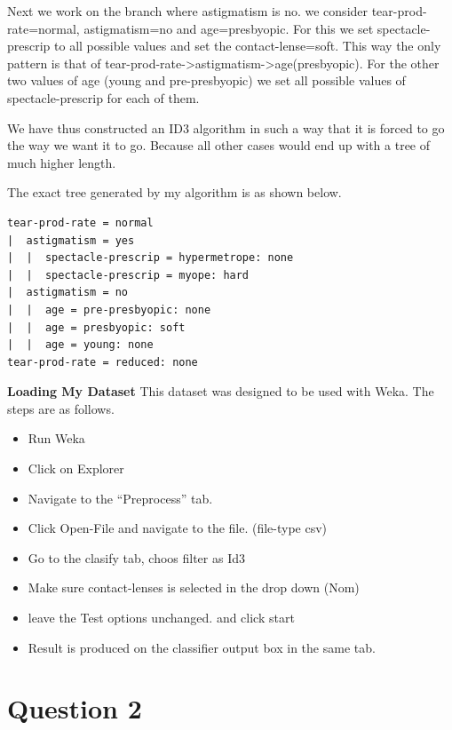 \documentclass[fontsize=10pt]{scrartcl}
\begin{document}
	Next we work on the branch where astigmatism is no. we consider tear-prod-rate=normal, astigmatism=no and age=presbyopic. For this we set spectacle-prescrip to all possible values and set the contact-lense=soft. This way the only pattern is that of tear-prod-rate->astigmatism->age(presbyopic). For the other two values of age (young and pre-presbyopic) we set all possible values of spectacle-prescrip for each of them. 

	We have thus constructed an ID3 algorithm in such a way that it is forced to go the way we want it to go. Because all other cases would end up with a tree of much higher length.

	The exact tree generated by my algorithm is as shown below.

\begin{verbatim}
tear-prod-rate = normal
|  astigmatism = yes
|  |  spectacle-prescrip = hypermetrope: none
|  |  spectacle-prescrip = myope: hard
|  astigmatism = no
|  |  age = pre-presbyopic: none
|  |  age = presbyopic: soft
|  |  age = young: none
tear-prod-rate = reduced: none
\end{verbatim}


	\textbf{Loading My Dataset}
	This dataset was designed to be used with Weka. The steps are as follows.
	\begin{itemize}
		\item
		Run Weka

		\item
		Click on Explorer

		\item
		Navigate to the ``Preprocess'' tab.

		\item
		Click Open-File and navigate to the file. (file-type csv)

		\item
		Go to the clasify tab, choos filter as Id3

		\item
		Make sure contact-lenses is selected in the drop down (Nom)

		\item
		leave the Test options unchanged. and click start

		\item
		Result is produced on the classifier output box in the same tab.
	\end{itemize}
	\section{Question 2}
\end{document}
